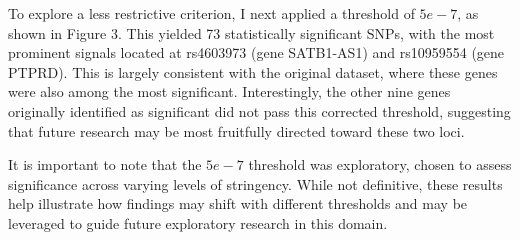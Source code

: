 \documentclass[12pt]{article}
\begin{document}
To explore a less restrictive criterion, I next applied a threshold of $5e-7$, as shown in Figure 3. This yielded 73 statistically significant SNPs, with the most prominent signals located at rs4603973 (gene SATB1-AS1) and rs10959554 (gene PTPRD). This is largely consistent with the original dataset, where these genes were also among the most significant. Interestingly, the other nine genes originally identified as significant did not pass this corrected threshold, suggesting that future research may be most fruitfully directed toward these two loci. \par

It is important to note that the $5e-7$ threshold was exploratory, chosen to assess significance across varying levels of stringency. While not definitive, these results help illustrate how findings may shift with different thresholds and may be leveraged to guide future exploratory research in this domain. \par
\end{document}
